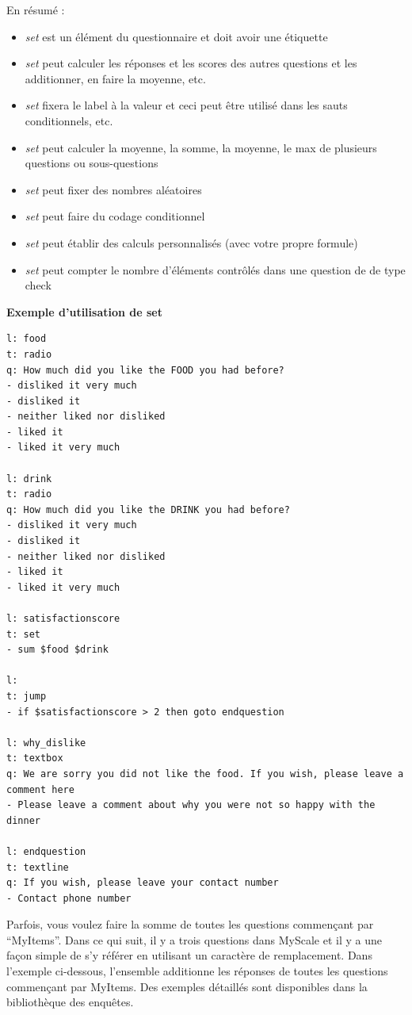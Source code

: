 \documentclass[
]{book}
\providecommand{\tightlist}{%
  \setlength{\itemsep}{0pt}\setlength{\parskip}{0pt}}
\begin{document}
En résumé :

\begin{itemize}
\tightlist
\item
  \emph{set} est un élément du questionnaire et doit avoir une étiquette
\item
  \emph{set} peut calculer les réponses et les scores des autres
  questions et les additionner, en faire la moyenne, etc.
\item
  \emph{set} fixera le label à la valeur et ceci peut être utilisé dans
  les sauts conditionnels, etc.
\item
  \emph{set} peut calculer la moyenne, la somme, la moyenne, le max de
  plusieurs questions ou sous-questions
\item
  \emph{set} peut fixer des nombres aléatoires
\item
  \emph{set} peut faire du codage conditionnel
\item
  \emph{set} peut établir des calculs personnalisés (avec votre propre
  formule)
\item
  \emph{set} peut compter le nombre d'éléments contrôlés dans une
  question de de type check
\end{itemize}

\textbf{Exemple d'utilisation de set}

\begin{verbatim}
l: food
t: radio
q: How much did you like the FOOD you had before?
- disliked it very much
- disliked it
- neither liked nor disliked
- liked it
- liked it very much

l: drink
t: radio
q: How much did you like the DRINK you had before?
- disliked it very much
- disliked it
- neither liked nor disliked
- liked it
- liked it very much

l: satisfactionscore
t: set
- sum $food $drink

l:
t: jump
- if $satisfactionscore > 2 then goto endquestion

l: why_dislike
t: textbox
q: We are sorry you did not like the food. If you wish, please leave a comment here
- Please leave a comment about why you were not so happy with the dinner

l: endquestion
t: textline
q: If you wish, please leave your contact number
- Contact phone number
\end{verbatim}

Parfois, vous voulez faire la somme de toutes les questions commençant
par ``MyItems''. Dans ce qui suit, il y a trois questions dans MyScale
et il y a une façon simple de s'y référer en utilisant un caractère de
remplacement. Dans l'exemple ci-dessous, l'ensemble additionne les
réponses de toutes les questions commençant par MyItems. Des exemples
détaillés sont disponibles dans la bibliothèque des enquêtes.
\end{document}

